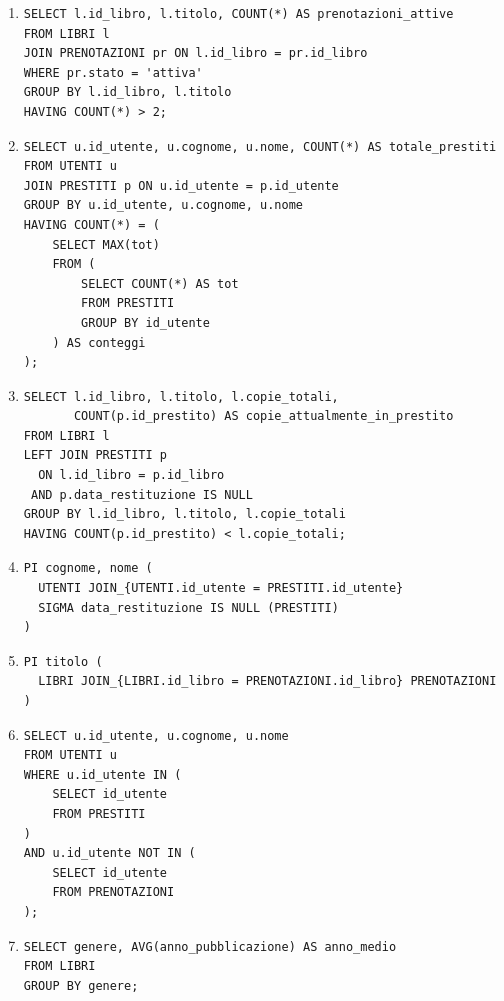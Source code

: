 \documentclass[a4paper,12pt]{article}
\begin{document}
\begin{enumerate}
		\item
\begin{verbatim}
SELECT l.id_libro, l.titolo, COUNT(*) AS prenotazioni_attive
FROM LIBRI l
JOIN PRENOTAZIONI pr ON l.id_libro = pr.id_libro
WHERE pr.stato = 'attiva'
GROUP BY l.id_libro, l.titolo
HAVING COUNT(*) > 2;
\end{verbatim}

		\item
\begin{verbatim}
SELECT u.id_utente, u.cognome, u.nome, COUNT(*) AS totale_prestiti
FROM UTENTI u
JOIN PRESTITI p ON u.id_utente = p.id_utente
GROUP BY u.id_utente, u.cognome, u.nome
HAVING COUNT(*) = (
    SELECT MAX(tot)
    FROM (
        SELECT COUNT(*) AS tot
        FROM PRESTITI
        GROUP BY id_utente
    ) AS conteggi
);
\end{verbatim}

		\item
\begin{verbatim}
SELECT l.id_libro, l.titolo, l.copie_totali,
       COUNT(p.id_prestito) AS copie_attualmente_in_prestito
FROM LIBRI l
LEFT JOIN PRESTITI p
  ON l.id_libro = p.id_libro
 AND p.data_restituzione IS NULL
GROUP BY l.id_libro, l.titolo, l.copie_totali
HAVING COUNT(p.id_prestito) < l.copie_totali;
\end{verbatim}

		\item
\begin{verbatim}
PI cognome, nome (
  UTENTI JOIN_{UTENTI.id_utente = PRESTITI.id_utente}
  SIGMA data_restituzione IS NULL (PRESTITI)
)
\end{verbatim}

		\item
\begin{verbatim}
PI titolo (
  LIBRI JOIN_{LIBRI.id_libro = PRENOTAZIONI.id_libro} PRENOTAZIONI
)
\end{verbatim}

		\item
\begin{verbatim}
SELECT u.id_utente, u.cognome, u.nome
FROM UTENTI u
WHERE u.id_utente IN (
    SELECT id_utente
    FROM PRESTITI
)
AND u.id_utente NOT IN (
    SELECT id_utente
    FROM PRENOTAZIONI
);
\end{verbatim}

		\item
\begin{verbatim}
SELECT genere, AVG(anno_pubblicazione) AS anno_medio
FROM LIBRI
GROUP BY genere;
\end{verbatim}
	\end{enumerate}
	
\end{document}
